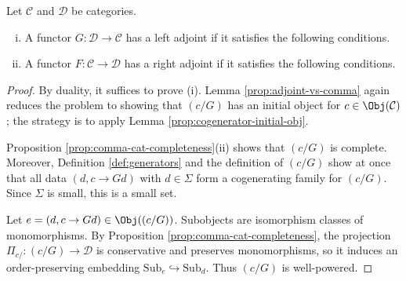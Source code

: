 \begin{theorem}\label{prop:SAFT}
	Let $\mathcal{C}$ and $\mathcal{D}$ be categories.
	\begin{enumerate}[(i)]
		\item A functor $G:\mathcal{D}\to\mathcal{C}$ has a left adjoint if it
		satisfies the following conditions.
		\item A functor $F:\mathcal{C}\to\mathcal{D}$ has a right adjoint if it
		satisfies the following conditions.
	\end{enumerate}
\end{theorem}
\begin{proof}
	By duality, it suffices to prove (i). Lemma
	\ref{prop:adjoint-vs-comma} again reduces the problem to showing that
	$(c/G)$ has an initial object for $c\in\Obj(\mathcal{C})$; the strategy is
	to apply Lemma \ref{prop:cogenerator-initial-obj}.

	Proposition \ref{prop:comma-cat-completeness}(ii) shows that $(c/G)$ is
	complete. Moreover, Definition \ref{def:generators} and the definition of
	$(c/G)$ show at once that all data $(d,c\to Gd)$ with $d\in\Sigma$ form a
	cogenerating family for $(c/G)$. Since $\Sigma$ is small, this is a small
	set.

	Let $e=(d,c\to Gd)\in\Obj((c/G))$. Subobjects are isomorphism classes of
	monomorphisms. By Proposition \ref{prop:comma-cat-completeness}, the
	projection $\Pi_{c/}:(c/G)\to\mathcal{D}$ is conservative and preserves
	monomorphisms, so it induces an order-preserving embedding
	$\mathrm{Sub}_e\hookrightarrow\mathrm{Sub}_d$. Thus $(c/G)$ is
	well-powered.
\end{proof}

